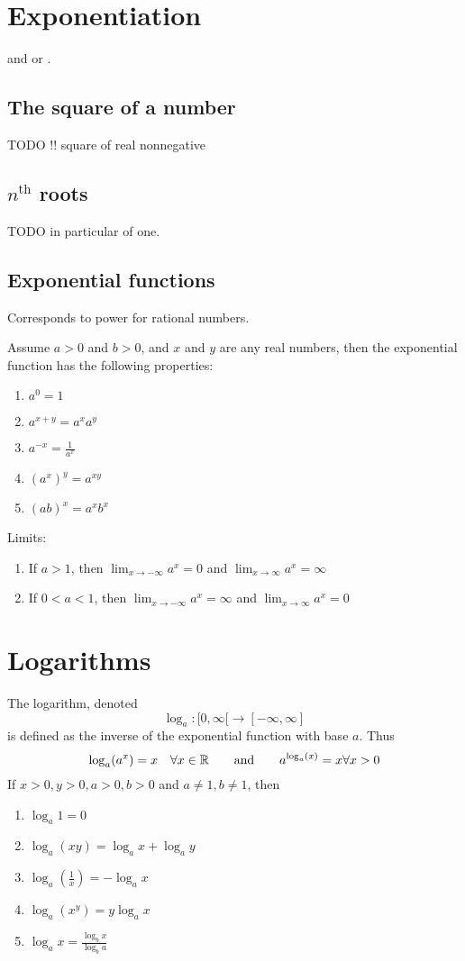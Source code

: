 \section{Exponentiation}
\begin{definition}
 and  or .
\end{definition}


\subsection{The square of a number}
TODO
!! square of real nonnegative

\subsection{$n^{\text{th}}$ roots}
TODO in particular of one.


\subsection{Exponential functions}
Corresponds to power for rational numbers.

Assume $a>0$ and $b>0$, and $x$ and $y$ are any real numbers, then the exponential function has the following properties:
\begin{enumerate}
\item $a^0 = 1$
\item $a^{x+y} = a^x a^y$
\item $a^{-x} = \frac{1}{a^x}$
\item $(a^x)^y = a^{xy}$
\item $(ab)^x = a^x b^x$
\end{enumerate}
Limits:
\begin{enumerate}
\item If $a>1$, then $\lim_{x\to -\infty} a^x = 0$ and $ \lim_{x\to \infty} a^x = \infty$
\item If $0 < a < 1$, then $\lim_{x\to -\infty} a^x = \infty$ and $ \lim_{x\to \infty} a^x = 0$
\end{enumerate}

\section{Logarithms}
The logarithm, denoted
\[ \log_a: [0,\infty[ \to [-\infty, \infty] \]
is defined as the inverse of the exponential function with base $a$. Thus
\[ \log_a(a^x) = x \quad \forall x\in\mathbb{R} \qquad \text{and} \qquad a^{\log_a(x)}=x \forall x>0 \]
If $x>0, y>0, a>0, b>0$ and $a \neq 1, b\neq 1$, then
\begin{enumerate}
\item $\log_a 1 = 0$
\item $\log_a(xy) = \log_a x + \log_a y$
\item $\log_a(\frac{1}{x}) = -\log_a x$
\item $\log_a(x^y) = y\log_a x$
\item $\log_a x = \frac{\log_b x}{\log_b a}$
\end{enumerate}


